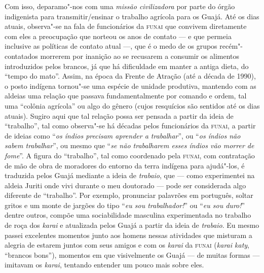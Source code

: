 Com isso, deparamo"-nos com uma \emph{missão civilizadora} por parte do
órgão indigenista para transmitir/ensinar o trabalho agrícola para os
Guajá. Até os dias atuais, observa"-se na fala de funcionários da \textsc{funai}
que convivem diretamente com eles a preocupação que norteou os anos de
contato --- e que permeia inclusive as políticas de contato atual ---, que é
o medo de os grupos recém"-contatados morrerem por inanição ao se
recusarem a consumir os alimentos introduzidos pelos brancos, já que há
dificuldade em manter a antiga dieta, do ``tempo do mato''. Assim, na
época da Frente de Atração (até a década de 1990), o posto indígena
tornou"-se uma espécie de unidade produtiva, mantendo com as aldeias uma
relação que passava fundamentalmente por comando e ordem, tal uma
``colônia agrícola'' ou algo do gênero (cujos resquícios são sentidos
até os dias atuais). Sugiro aqui que tal relação possa ser pensada a
partir da ideia de ``trabalho'', tal como observa"-se há décadas pelos
funcionários da \textsc{funai}, a partir de ideias como ``\emph{os índios
precisam aprender a trabalhar}'', ou ``\emph{os índios não sabem
trabalhar}'', ou mesmo que ``\emph{se não trabalharem esses índios vão
morrer de fome}''. A figura do ``trabalho'', tal como coordenado pela
\textsc{funai}, com contratação de mão de obra de moradores do entorno da terra
indígena para ajudá"-los, é traduzida pelos Guajá mediante a ideia de
\emph{trabaio}, que --- como experimentei na aldeia Juriti onde vivi
durante o meu doutorado --- pode ser considerada algo diferente de
``trabalho''. Por exemplo, pronunciar palavrões em português, soltar
gritos e um monte de jargões do tipo ``\emph{eu sou trabalhador!}'' ou
``\emph{eu sou duro!}'' dentre outros, compõe uma sociabilidade
masculina experimentada no trabalho de roça dos \emph{karai} e
atualizada pelos Guajá a partir da ideia de \emph{trabaio}. Eu mesmo
passei excelentes momentos junto aos homens nessas atividades que
misturam a alegria de estarem juntos com seus amigos e com os
\emph{karai} da \textsc{funai} (\emph{karai katy}, ``brancos bons''), momentos em
que visivelmente os Guajá --- de muitas formas --- imitavam os \emph{karai},
tentando entender um pouco mais sobre eles.

